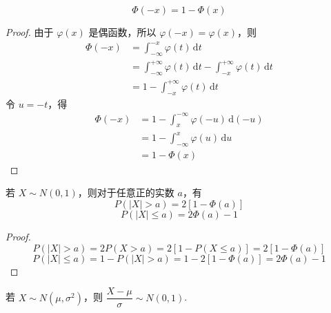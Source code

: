 \begin{property}
    \begin{equation} \label{equation:Phi(-x)}
        \varPhi(-x) = 1-\varPhi(x)
    \end{equation}
\end{property}

\begin{proof}
    由于 $\varphi(x)$ 是偶函数，所以 $\varphi(-x)=\varphi(x)$，则
    $$
    \begin{aligned}
        \varPhi(-x) &= \int_{-\infty}^{-x} \varphi(t) \,\text{d}t \\
        &= \int_{-\infty}^{+\infty} \varphi(t) \,\text{d}t - \int_{-x}^{+\infty} \varphi(t) \,\text{d}t \\
        &= 1 - \int_{-x}^{+\infty} \varphi(t) \,\text{d}t
    \end{aligned}
    $$
    令 $u=-t$，得
    $$
    \begin{aligned}
        \varPhi(-x) &= 1 - \int_{x}^{-\infty} \varphi(-u) \,\text{d}(-u) \\
        &= 1 - \int_{-\infty}^{x} \varphi(u) \,\text{d}u \\
        &= 1-\varPhi(x)
    \end{aligned}
    $$

    \vspace{-1.5em}
\end{proof}

\begin{property}
    \indent 若 $X \sim N(0,1)$，则对于任意正的实数 $a$，有
    \begin{equation} \label{equation:P(X>a)}
        P(|X|>a) = 2[1 - \varPhi(a)]
    \end{equation}
    \begin{equation} \label{equation:P(X<=a)}
        P(|X| \leqslant a) = 2 \varPhi(a) - 1
    \end{equation}
\end{property}

\begin{proof}
    $$
    P(|X|>a) = 2 P(X>a) = 2[1 - P(X \leqslant a)] = 2[1-\varPhi(a)]
    $$
    $$
    P(|X| \leqslant a) = 1 - P(|X|>a) = 1-2[1-\varPhi(a)] = 2\varPhi(a)-1
    $$

    \vspace{-2em}
\end{proof}

\begin{property}
    \indent 若 $X \sim N(\mu,\sigma^2)$，则 $\dfrac{X - \mu}{\sigma} \sim N(0,1)$.
\end{property}

